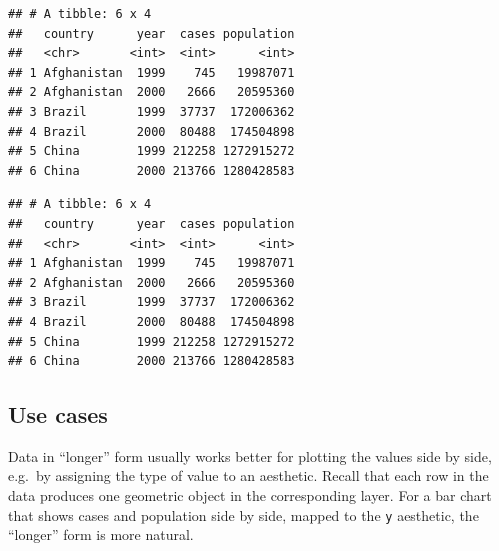 \documentclass[]{book}
\newenvironment{Shaded}{}{}
\newcommand{\DataTypeTok}[1]{#1}
\newcommand{\KeywordTok}[1]{\textcolor[rgb]{0.00,0.00,1.00}{#1}}
\newcommand{\NormalTok}[1]{#1}
\newcommand{\OperatorTok}[1]{#1}
\newcommand{\StringTok}[1]{\textcolor[rgb]{0.00,0.50,0.50}{#1}}
\begin{document}
\begin{Shaded}
\end{Shaded}

\begin{verbatim}
## # A tibble: 6 x 4
##   country      year  cases population
##   <chr>       <int>  <int>      <int>
## 1 Afghanistan  1999    745   19987071
## 2 Afghanistan  2000   2666   20595360
## 3 Brazil       1999  37737  172006362
## 4 Brazil       2000  80488  174504898
## 5 China        1999 212258 1272915272
## 6 China        2000 213766 1280428583
\end{verbatim}

\begin{Shaded}
\end{Shaded}

\begin{verbatim}
## # A tibble: 6 x 4
##   country      year  cases population
##   <chr>       <int>  <int>      <int>
## 1 Afghanistan  1999    745   19987071
## 2 Afghanistan  2000   2666   20595360
## 3 Brazil       1999  37737  172006362
## 4 Brazil       2000  80488  174504898
## 5 China        1999 212258 1272915272
## 6 China        2000 213766 1280428583
\end{verbatim}

\hypertarget{use-cases}{%
\subsection{Use cases}\label{use-cases}}

Data in ``longer'' form usually works better for plotting the values side by side, e.g.~by assigning the type of value to an aesthetic.
Recall that each row in the data produces one geometric object in the corresponding layer.
For a bar chart that shows cases and population side by side, mapped to the \texttt{y} aesthetic, the ``longer'' form is more natural.
\end{document}
